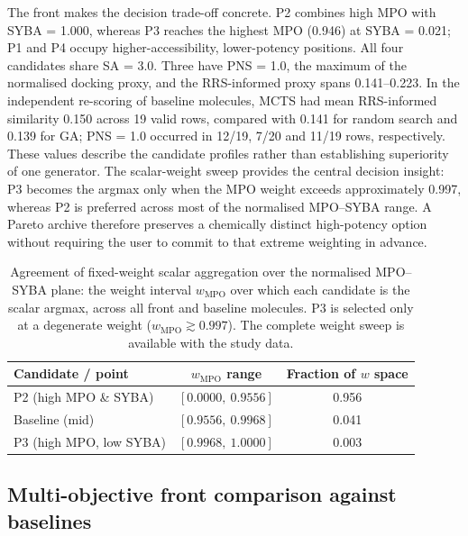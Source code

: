 \documentclass[10pt,a4paper]{article}
\begin{document}
The front makes the decision trade-off concrete. P2 combines high MPO with SYBA = \num{1.000}, whereas P3 reaches the highest MPO (\num{0.946}) at SYBA = \num{0.021}; P1 and P4 occupy higher-accessibility, lower-potency positions. All four candidates share SA = \num{3.0}. Three have PNS = \num{1.0}, the maximum of the normalised docking proxy, and the RRS-informed proxy spans \num{0.141}--\num{0.223}. In the independent re-scoring of baseline molecules, MCTS had mean RRS-informed similarity \num{0.150} across \num{19} valid rows, compared with \num{0.141} for random search and \num{0.139} for GA; PNS = \num{1.0} occurred in \num{12}/\num{19}, \num{7}/\num{20} and \num{11}/\num{19} rows, respectively. These values describe the candidate profiles rather than establishing superiority of one generator. The scalar-weight sweep provides the central decision insight: P3 becomes the argmax only when the MPO weight exceeds approximately \num{0.997}, whereas P2 is preferred across most of the normalised MPO--SYBA range. A Pareto archive therefore preserves a chemically distinct high-potency option without requiring the user to commit to that extreme weighting in advance.

\begin{table}[htbp]
  \centering
  \caption{Agreement of fixed-weight scalar aggregation over the normalised MPO--SYBA plane: the weight interval $w_{\text{MPO}}$ over which each candidate is the scalar argmax, across all front and baseline molecules. P3 is selected only at a degenerate weight ($w_{\text{MPO}}\gtrsim\num{0.997}$). The complete weight sweep is available with the study data.}
  \label{tab:scalar_sweep}
  \begin{tabular}{lcS[table-format=1.3]}
    \toprule
    {Candidate / point} & {$w_{\text{MPO}}$ range} & {Fraction of $w$ space} \\
    \midrule
    P2 (high MPO \& SYBA) & $[0.0000,\ 0.9556]$ & \num{0.956} \\
    Baseline (mid)         & $[0.9556,\ 0.9968]$ & \num{0.041} \\
    P3 (high MPO, low SYBA) & $[0.9968,\ 1.0000]$ & \num{0.003} \\
    \bottomrule
  \end{tabular}
\end{table}

\subsection{Multi-objective front comparison against baselines}
\label{sec:front_comparison}
\end{document}

